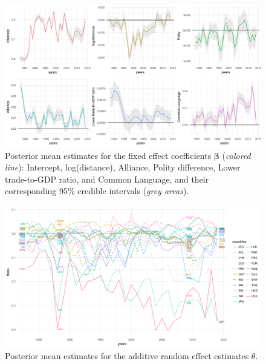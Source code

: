 \documentclass[a4paper]{article}
\begin{document}
\begin{figure}[ht]
	\begin{center}
		\includegraphics[width=1\textwidth]{plots_paper/betaplot-1.png}
	\end{center}
	 	\caption {Posterior mean estimates for the fixed effect coefficients $\boldsymbol{\beta}$ (\textit{colored line}): Intercept, log(distance), Alliance, Polity difference, Lower trade-to-GDP ratio, and Common Language, and their corresponding 95\% credible intervals (\textit{grey areas}). }
	\label{figure:interceptplot}
\end{figure}
 \begin{figure}[ht]
 	\begin{center}
 		\includegraphics[width=1\textwidth]{plots_paper/thetaplot-1.png}	
 	\end{center}
 	\caption {Posterior mean estimates for the additive random effect estimates $\theta$.}
 	\label{figure:thetaplot}
 \end{figure}
\end{document}
